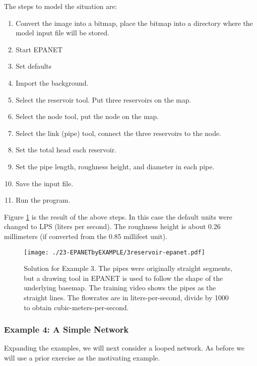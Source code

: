 The steps to model the situation are:
\begin{enumerate}
\item Convert the image into a bitmap, place the bitmap into a directory where the model input file will be stored.
\item Start EPANET
\item Set defaults
\item Import the background.
\item Select the reservoir tool.  Put three reservoirs on the map.
\item Select the node tool, put the node on the map.
\item Select the link (pipe) tool, connect the three reservoirs to the node.  
\item Set the total head each reservoir.
\item Set the pipe length, roughness height, and diameter in each pipe.
\item Save the input file.
\item Run the program.   
\end{enumerate}

Figure \ref{fig:3reservoir-epanet} is the result of the above steps.   In this case the default units were changed to LPS (liters per second).  The roughness height is about 0.26 millimeters (if converted from the 0.85 millifeet unit).

\begin{figure}[htbp] %
   \centering
   \texttt{[image: ./23-EPANETbyEXAMPLE/3reservoir-epanet.pdf]} 
   \caption{Solution for Example 3.  The pipes were originally straight segments, but a drawing tool in EPANET is used to follow the shape of the underlying basemap.   The training video shows the pipes as the straight lines.  The flowrates are in liters-per-second, divide by 1000 to obtain cubic-meters-per-second.}
   \label{fig:3reservoir-epanet}
\end{figure}
\clearpage
\subsubsection{Example 4: A Simple Network}
Expanding the examples, we will next consider a looped network.   As before we will use a prior exercise as the motivating example.

